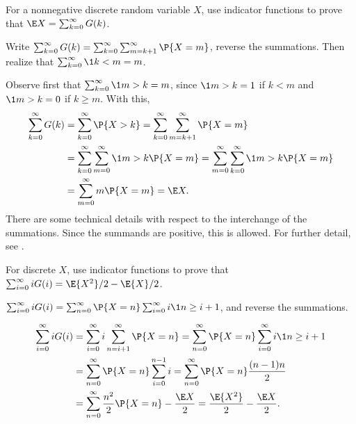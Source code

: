 \documentclass[queueing_book]{subfiles}
\begin{document}
\begin{exercise}\label{ex:6}
 For a nonnegative discrete random variable $X$, use indicator functions to prove that $\E X = \sum_{k=0}^\infty G(k)$.
\begin{hint}
Write
$\sum_{k=0}^\infty G(k) = \sum_{k=0}^\infty \sum_{m=k+1}^\infty \P{X=m}$, reverse the summations. Then realize that $\sum_{k=0}^\infty \1{k<m} = m$.
\end{hint}
\begin{solution}
Observe first that $\sum_{k=0}^\infty \1{m>k} = m$, since $\1{m>k}=1$ if $k<m$ and $\1{m>k} = 0$ if $k\geq m$. With this,
\begin{align*}
\sum_{k=0}^\infty G(k)
&= \sum_{k=0}^\infty \P{X>k}
= \sum_{k=0}^\infty \sum_{m=k+1}^\infty \P{X=m} \\
& = \sum_{k=0}^\infty \sum_{m=0}^\infty \1{m>k} \P{X=m}
= \sum_{m=0}^\infty \sum_{k=0}^\infty \1{m>k} \P{X=m} \\
&= \sum_{m=0}^\infty m\P{X=m} = \E X.
\end{align*}
There are some technical details with respect to the interchange of the summations.
Since the summands are positive, this is allowed.
For further detail, see \citet{capinski03:_probab_probl}.
\end{solution}
\end{exercise}

\begin{exercise}\label{ex:66}
For discrete $X$,  use indicator functions to prove that
$\sum_{i=0}^\infty i G(i) = \E{X^2}/2 - \E{X}/2$.
\begin{hint}
$\sum_{i=0}^\infty i G(i) = \sum_{n=0}^\infty \P{X=n} \sum_{i=0}^\infty i \1{n\geq i+1}$,
and reverse the summations.
\end{hint}
\begin{solution}
\begin{align*}
\sum_{i=0}^\infty i G(i)
&= \sum_{i=0}^\infty i \sum_{n=i+1}^\infty \P{X=n} = \sum_{n=0}^\infty \P{X=n} \sum_{i=0}^\infty i \1{n\geq i+1} \\
&= \sum_{n=0}^\infty \P{X=n} \sum_{i=0}^{n-1}i = \sum_{n=0}^\infty \P{X=n} \frac{(n-1)n}{2} \\
&= \sum_{n=0}^\infty \frac{n^2}{2} \P{X=n} - \frac{\E X}{2}
= \frac{\E{X^2}}{2} - \frac{\E X}{2}.
\end{align*}
\end{solution}
\end{exercise}
\end{document}
